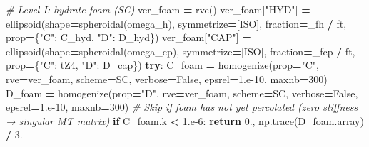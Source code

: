 \documentclass[
  a4paper,
  numbers=noendperiod,
  DIV=12]{scrreprt}
\newenvironment{Shaded}{\begin{snugshade}}{\end{snugshade}}
\newcommand{\CommentTok}[1]{\textcolor[rgb]{0.56,0.35,0.01}{\textit{#1}}}
\newcommand{\ControlFlowTok}[1]{\textcolor[rgb]{0.13,0.29,0.53}{\textbf{#1}}}
\newcommand{\DecValTok}[1]{\textcolor[rgb]{0.00,0.00,0.81}{#1}}
\newcommand{\FloatTok}[1]{\textcolor[rgb]{0.00,0.00,0.81}{#1}}
\newcommand{\NormalTok}[1]{#1}
\newcommand{\OperatorTok}[1]{\textcolor[rgb]{0.81,0.36,0.00}{\textbf{#1}}}
\newcommand{\StringTok}[1]{\textcolor[rgb]{0.31,0.60,0.02}{#1}}
\newcommand{\VariableTok}[1]{\textcolor[rgb]{0.00,0.00,0.00}{#1}}
\begin{document}
\begin{Shaded}
\begin{Highlighting}[]
    \CommentTok{\# Level I: hydrate foam (SC)}
\NormalTok{    ver\_foam }\OperatorTok{=}\NormalTok{ rve()}
\NormalTok{    ver\_foam[}\StringTok{"HYD"}\NormalTok{] }\OperatorTok{=}\NormalTok{ ellipsoid(shape}\OperatorTok{=}\NormalTok{spheroidal(omega\_h),  symmetrize}\OperatorTok{=}\NormalTok{[ISO],}
\NormalTok{                                fraction}\OperatorTok{=}\NormalTok{\_fh  }\OperatorTok{/}\NormalTok{ ft, prop}\OperatorTok{=}\NormalTok{\{}\StringTok{"C"}\NormalTok{: C\_hyd, }\StringTok{"D"}\NormalTok{: D\_hyd\})}
\NormalTok{    ver\_foam[}\StringTok{"CAP"}\NormalTok{] }\OperatorTok{=}\NormalTok{ ellipsoid(shape}\OperatorTok{=}\NormalTok{spheroidal(omega\_cp), symmetrize}\OperatorTok{=}\NormalTok{[ISO],}
\NormalTok{                                fraction}\OperatorTok{=}\NormalTok{\_fcp }\OperatorTok{/}\NormalTok{ ft, prop}\OperatorTok{=}\NormalTok{\{}\StringTok{"C"}\NormalTok{: tZ4,   }\StringTok{"D"}\NormalTok{: D\_cap\})}
    \ControlFlowTok{try}\NormalTok{:}
\NormalTok{        C\_foam }\OperatorTok{=}\NormalTok{ homogenize(prop}\OperatorTok{=}\StringTok{"C"}\NormalTok{, rve}\OperatorTok{=}\NormalTok{ver\_foam, scheme}\OperatorTok{=}\NormalTok{SC,}
\NormalTok{                            verbose}\OperatorTok{=}\VariableTok{False}\NormalTok{, epsrel}\OperatorTok{=}\FloatTok{1.e{-}10}\NormalTok{, maxnb}\OperatorTok{=}\DecValTok{300}\NormalTok{)}
\NormalTok{        D\_foam }\OperatorTok{=}\NormalTok{ homogenize(prop}\OperatorTok{=}\StringTok{"D"}\NormalTok{, rve}\OperatorTok{=}\NormalTok{ver\_foam, scheme}\OperatorTok{=}\NormalTok{SC,}
\NormalTok{                            verbose}\OperatorTok{=}\VariableTok{False}\NormalTok{, epsrel}\OperatorTok{=}\FloatTok{1.e{-}10}\NormalTok{, maxnb}\OperatorTok{=}\DecValTok{300}\NormalTok{)}
        \CommentTok{\# Skip if foam has not yet percolated (zero stiffness → singular MT matrix)}
        \ControlFlowTok{if}\NormalTok{ C\_foam.k }\OperatorTok{\textless{}} \FloatTok{1.e{-}6}\NormalTok{:}
            \ControlFlowTok{return} \FloatTok{0.}\NormalTok{, np.trace(D\_foam.array) }\OperatorTok{/} \FloatTok{3.}


\end{Highlighting}
\end{Shaded}
\end{document}
